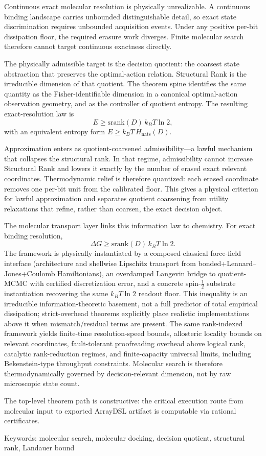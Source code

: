 Continuous exact molecular resolution is physically unrealizable. A continuous binding landscape carries unbounded distinguishable detail, so exact state discrimination requires unbounded acquisition events. Under any positive per-bit dissipation floor, the required erasure work diverges. Finite molecular search therefore cannot target continuous exactness directly.

The physically admissible target is the decision quotient: the coarsest state abstraction that preserves the optimal-action relation. Structural Rank is the irreducible dimension of that quotient. The theorem spine identifies the same quantity as the Fisher-identifiable dimension in a canonical optimal-action observation geometry, and as the controller of quotient entropy. The resulting exact-resolution law is
\[
E \ge \mathrm{srank}(D)\,k_B T\ln 2,
\]
with an equivalent entropy form $E \ge k_B T\,H_{\mathrm{nats}}(D)$.

Approximation enters as quotient-coarsened admissibility---a lawful mechanism that collapses the structural rank. In that regime, admissibility cannot increase Structural Rank and lowers it exactly by the number of erased exact relevant coordinates. Thermodynamic relief is therefore quantized: each erased coordinate removes one per-bit unit from the calibrated floor. This gives a physical criterion for lawful approximation and separates quotient coarsening from utility relaxations that refine, rather than coarsen, the exact decision object.

The molecular transport layer links this information law to chemistry. For exact binding resolution,
\[
\Delta G \ge \mathrm{srank}(D)\,k_B T\ln 2.
\]
The framework is physically instantiated by a composed classical force-field interface (architecture and shellwise Lipschitz transport from bonded+Lennard--Jones+Coulomb Hamiltonians), an overdamped Langevin bridge to quotient-MCMC with certified discretization error, and a concrete spin-$\tfrac12$ substrate instantiation recovering the same $k_B T\ln 2$ readout floor.
This inequality is an irreducible information-theoretic basement, not a full predictor of total empirical dissipation; strict-overhead theorems explicitly place realistic implementations above it when mismatch/residual terms are present. The same rank-indexed framework yields finite-time resolution-speed bounds, allosteric locality bounds on relevant coordinates, fault-tolerant proofreading overhead above logical rank, catalytic rank-reduction regimes, and finite-capacity universal limits, including Bekenstein-type throughput constraints. Molecular search is therefore thermodynamically governed by decision-relevant dimension, not by raw microscopic state count.

The top-level theorem path is constructive: the critical execution route from molecular input to exported ArrayDSL artifact is computable via rational certificates.

Keywords: molecular search, molecular docking, decision quotient, structural rank, Landauer bound
